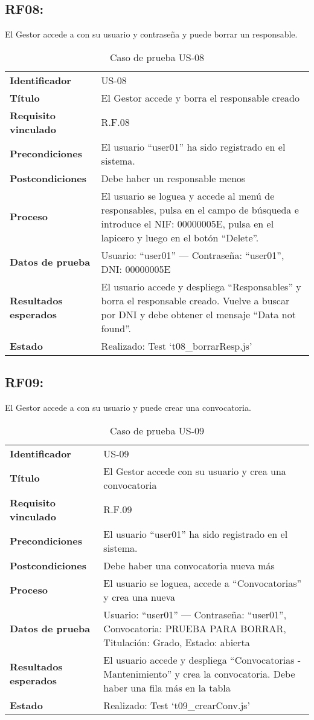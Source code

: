 \subsection*{RF08:} El Gestor accede a con su usuario y contraseña y puede borrar un responsable.
\begin{table}[H]
	\centering
	\small
	\caption{Caso de prueba US-08}
	\label{tab:caso_us08}
	\begin{tabular}{>{\bfseries}l p{11cm}}
		Identificador & US-08 \\
		Título & El Gestor accede y borra el responsable creado \\
		Requisito vinculado & R.F.08 \\
		Precondiciones & El usuario “user01” ha sido registrado en el sistema. \\
		Postcondiciones & Debe haber un responsable menos \\
		Proceso & El usuario se loguea y accede al menú de responsables, pulsa en el campo de búsqueda e introduce el NIF: 00000005E, pulsa en el lapicero y luego en el botón “Delete”. \\
		Datos de prueba & Usuario: “user01” — Contraseña: “user01”, DNI: 00000005E \\
		Resultados esperados & El usuario accede y despliega “Responsables” y borra el responsable creado. Vuelve a buscar por DNI y debe obtener el mensaje “Data not found”. \\
		Estado & Realizado: Test `t08\_borrarResp.js' \\
	\end{tabular}
\end{table}

\subsection*{RF09:} El Gestor accede a con su usuario y puede crear una convocatoria.
\begin{table}[H]
	\centering
	\small
	\caption{Caso de prueba US-09}
	\label{tab:caso_us09}
	\begin{tabular}{>{\bfseries}l p{11cm}}
		Identificador & US-09 \\
		Título & El Gestor accede con su usuario y crea una convocatoria \\
		Requisito vinculado & R.F.09 \\
		Precondiciones & El usuario “user01” ha sido registrado en el sistema. \\
		Postcondiciones & Debe haber una convocatoria nueva más \\
		Proceso & El usuario se loguea, accede a “Convocatorias” y crea una nueva \\
		Datos de prueba & Usuario: “user01” — Contraseña: “user01”, Convocatoria: PRUEBA PARA BORRAR, Titulación: Grado, Estado: abierta \\
		Resultados esperados & El usuario accede y despliega “Convocatorias - Mantenimiento” y crea la convocatoria. Debe haber una fila más en la tabla \\
		Estado & Realizado: Test `t09\_crearConv.js'\\
	\end{tabular}
\end{table}

